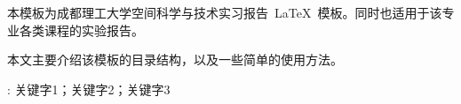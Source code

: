\begin{center}
    \LARGE{}
\end{center}
\par\vspace{2.5 ex}

\begin{cnabstract}
    本模板为成都理工大学空间科学与技术实习报告~\LaTeX~模板。同时也适用于该专业各类课程的实验报告。

    本文主要介绍该模板的目录结构，以及一些简单的使用方法。
\end{cnabstract}
: 关键字1；关键字2；关键字3

